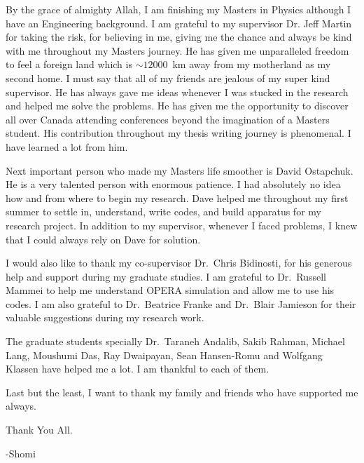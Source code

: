 \newpage
\tableofcontents
{}
\listoffigures
\listoftables

\begin{acknowledgments}
\vspace{2em}

By the grace of almighty Allah, I am finishing my Masters in Physics although I have an Engineering background. I am grateful to my supervisor Dr. Jeff Martin for taking the risk, for believing in me, giving me the chance and always be kind with me throughout my Masters journey. He has given me unparalleled freedom to feel a foreign land which is $\sim12000$~km away from my motherland as my second home. I must say that all of my friends are jealous of my super kind supervisor. He has always gave me ideas whenever I was stucked in the research and helped me solve the problems. He has given me the opportunity to discover all over Canada attending conferences beyond the imagination of a Masters student. His contribution throughout my thesis writing journey is phenomenal. I have learned a lot from him.

Next important person who made my Masters life smoother is David Ostapchuk. He is a very talented person with enormous patience. I had absolutely no idea how and from where to begin my research. Dave helped me throughout my first summer to settle in, understand, write codes, and build apparatus for my research project. In addition to my supervisor, whenever I faced problems, I knew that I could always rely on Dave for solution.

I would also like to thank my co-supervisor Dr.~Chris Bidinosti, for his generous help and support during my graduate studies. I am grateful to Dr.~Russell Mammei to help me understand OPERA simulation and allow me to use his codes. I am also grateful to Dr.~Beatrice Franke and Dr.~Blair Jamieson for their valuable suggestions during my research work. 

The graduate students specially Dr.~Taraneh Andalib, Sakib Rahman, Michael Lang, Moushumi Das, Ray Dwaipayan, Sean Hansen-Romu and Wolfgang Klassen have helped me a lot. I am thankful to each of them. 

Last but the least, I want to thank my family and friends who have supported me always. 

\vspace{2em}
Thank You All.

-Shomi

\end{acknowledgments}

